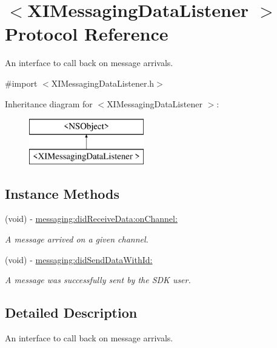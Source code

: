 \hypertarget{protocol_x_i_messaging_data_listener_01-p}{}\section{$<$X\+I\+Messaging\+Data\+Listener $>$ Protocol Reference}
\label{protocol_x_i_messaging_data_listener_01-p}


An interface to call back on message arrivals.  




{\ttfamily \#import $<$X\+I\+Messaging\+Data\+Listener.\+h$>$}

Inheritance diagram for $<$X\+I\+Messaging\+Data\+Listener $>$\+:\begin{figure}[H]
\begin{center}
\leavevmode
\includegraphics[height=2.000000cm]{protocol_x_i_messaging_data_listener_01-p}
\end{center}
\end{figure}
\subsection*{Instance Methods}
\begin{DoxyCompactItemize}
\item 
(void) -\/ \hyperlink{protocol_x_i_messaging_data_listener_01-p_a1693f95f44643f3b134db2c90e03e593}{messaging\+:did\+Receive\+Data\+:on\+Channel\+:}
\begin{DoxyCompactList}\small\item\em A message arrived on a given channel. \end{DoxyCompactList}\item 
(void) -\/ \hyperlink{protocol_x_i_messaging_data_listener_01-p_a0b4113fc83b613e4d137e642a2e1a35b}{messaging\+:did\+Send\+Data\+With\+Id\+:}
\begin{DoxyCompactList}\small\item\em A message was successfully sent by the S\+DK user. \end{DoxyCompactList}\end{DoxyCompactItemize}


\subsection{Detailed Description}
An interface to call back on message arrivals. 

